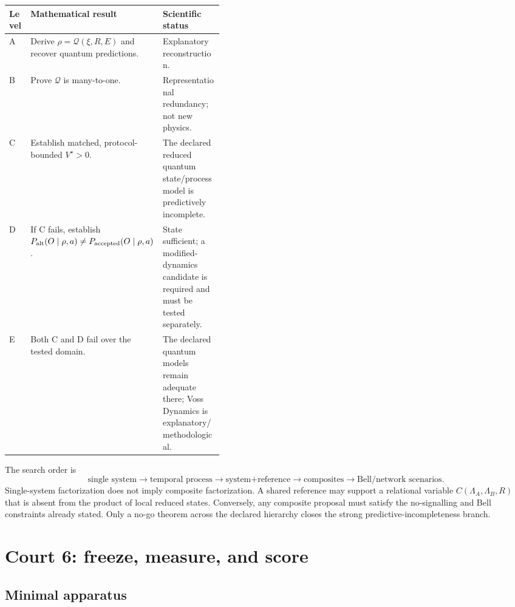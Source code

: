 \documentclass[10pt]{article}
\theoremstyle{definition}
\theoremstyle{remark}
\newcommand{\cQ}{\mathcal Q}
\begin{document}
\begin{table}[H]
\centering
\small
\begin{tabularx}{\linewidth}{@{}p{0.10\linewidth}p{0.31\linewidth}X@{}}
\toprule
Level & Mathematical result & Scientific status\\
\midrule
A & Derive \(\rho=\cQ(\xi,R,E)\) and recover quantum predictions. & Explanatory reconstruction.\\
B & Prove \(\cQ\) is many-to-one. & Representational redundancy; not new physics.\\
C & Establish matched, protocol-bounded \(V^\star>0\). & The declared reduced quantum state/process model is predictively incomplete.\\
D & If C fails, establish \(P_{\rm alt}(O\mid\rho,a)\neq P_{\rm accepted}(O\mid\rho,a)\). & State sufficient; a modified-dynamics candidate is required and must be tested separately.\\
E & Both C and D fail over the tested domain. & The declared quantum models remain adequate there; Voss Dynamics is explanatory/methodological.\\
\bottomrule
\end{tabularx}
\end{table}

The search order is
\[
\text{single system}
\longrightarrow
\text{temporal process}
\longrightarrow
\text{system+reference}
\longrightarrow
\text{composites}
\longrightarrow
\text{Bell/network scenarios}.
\]
Single-system factorization does not imply composite factorization. A shared reference may support a relational variable
\(C(\Lambda_A,\Lambda_B,R)\)
that is absent from the product of local reduced states. Conversely, any composite proposal must satisfy the no-signalling and Bell constraints already stated. Only a no-go theorem across the declared hierarchy closes the strong predictive-incompleteness branch.

\section{Court 6: freeze, measure, and score}

\subsection{Minimal apparatus}
\end{document}
